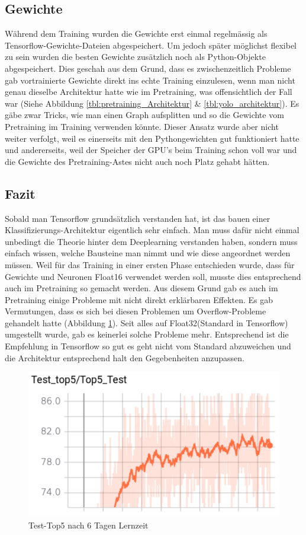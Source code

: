 \subsection{Gewichte}
Während dem Training wurden die Gewichte erst einmal regelmässig als Tensorflow-Gewichte-Dateien abgespeichert.
Um jedoch später möglichst flexibel zu sein wurden die besten Gewichte zusätzlich noch als Python-Objekte abgespeichert.
Dies geschah aus dem Grund, dass es zwischenzeitlich Probleme gab vortrainierte Gewichte direkt ins echte Training einzulesen, wenn man nicht genau dieselbe Architektur hatte wie im Pretraining, was offensichtlich der Fall war (Siehe Abbildung \ref{tbl:pretraining_Architektur} \& \ref{tbl:yolo_architektur}).
Es gäbe zwar Tricks, wie man einen Graph aufsplitten und so die Gewichte vom Pretraining im Training verwenden könnte. 
Dieser Ansatz wurde aber nicht weiter verfolgt, weil es einerseits mit den Pythongewichten gut funktioniert hatte und andererseits, weil der Speicher der GPU's beim Training schon voll war und die Gewichte des Pretraining-Astes nicht auch noch Platz gehabt hätten.

\subsection{Fazit}
Sobald man Tensorflow grundsätzlich verstanden hat, ist das bauen einer Klassifizierungs-Architektur eigentlich sehr einfach. 
Man muss dafür nicht einmal unbedingt die Theorie hinter dem Deeplearning verstanden haben, sondern muss einfach wissen, welche Bausteine \grqq{}man\grqq{} nimmt und wie diese angeordnet werden müssen.
Weil für das Training in einer ersten Phase entschieden wurde, dass für Gewichte und Neuronen Float16 verwendet werden soll, musste dies entsprechend auch im Pretraining so gemacht werden. 
Aus diesem Grund gab es auch im Pretraining einige Probleme mit nicht direkt erklärbaren Effekten.
Es gab Vermutungen, dass es sich bei diesen Problemen um Overflow-Probleme gehandelt hatte (Abbildung \ref{img:overvlow_pretraining}).
Seit alles auf Float32(Standard in Tensorflow) umgestellt wurde, gab es keinerlei solche Probleme mehr.
Entsprechend ist die Empfehlung in Tensorflow so gut es geht nicht vom Standard abzuweichen und die Architektur entsprechend halt den Gegebenheiten anzupassen.
\begin{figure}
	\centering
	\includegraphics[width=.7\textwidth]{Kapitel/20Pretraining/Bilder/Test_top5.pdf}
	\caption{Test-Top5 nach 6 Tagen Lernzeit}
	\label{img:overvlow_pretraining}
\end{figure}  
 